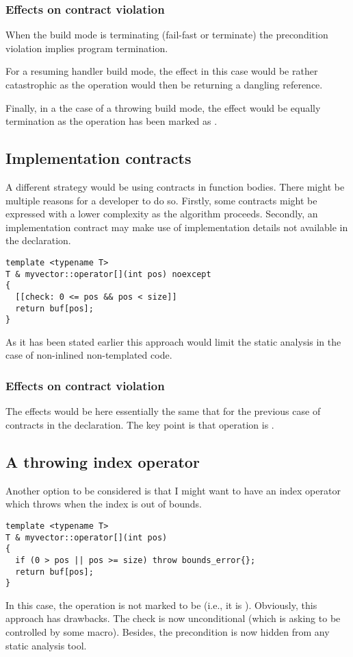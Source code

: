 \subsubsection{Effects on contract violation}

When the build mode is terminating (fail-fast or terminate) the precondition
violation implies program termination. 

For a resuming handler build mode, the effect in this case would be rather catastrophic as
the operation would then be returning a dangling reference.

Finally, in a the case of a throwing build mode, the effect would be equally
termination as the operation has been marked as .

\subsection{Implementation contracts}

A different strategy would be using contracts in function bodies. There might be
multiple reasons for a developer to do so. Firstly, some contracts might be
expressed with a lower complexity as the algorithm proceeds. Secondly, an
implementation contract may make use of implementation details not available in
the declaration.

\begin{lstlisting}
template <typename T>
T & myvector::operator[](int pos) noexcept
{
  [[check: 0 <= pos && pos < size]] 
  return buf[pos];
}
\end{lstlisting}

As it has been stated earlier this approach would limit the static analysis in
the case of non-inlined non-templated code.

\subsubsection{Effects on contract violation}

The effects would be here essentially the same that for the previous case of
contracts in the declaration. The key point is that operation is .

\subsection{A throwing index operator}

Another option to be considered is that I might want to have an index operator
which throws when the index is out of bounds.

\begin{lstlisting}
template <typename T>
T & myvector::operator[](int pos)
{
  if (0 > pos || pos >= size) throw bounds_error{};
  return buf[pos];
}
\end{lstlisting}

In this case, the operation is not marked to be  (i.e., it is
). Obviously, this approach has drawbacks. The check is
now unconditional (which is asking to be controlled by some macro). Besides, the
precondition is now hidden from any static analysis tool.
